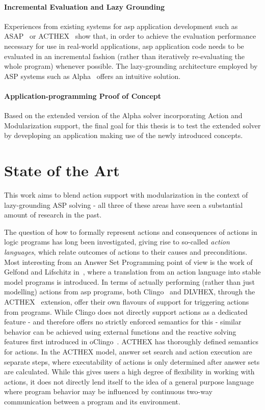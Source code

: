 \paragraph{Incremental Evaluation and Lazy Grounding} Experiences from existing systems for \gls{asp} application development such as ASAP~\cite{aspetris} or ACTHEX~\cite{acthex} show that, in order to achieve the evaluation performance necessary for use in real-world applications, \gls{asp} application code needs to be evaluated in an incremental fashion (rather than iteratively re-evaluating the whole program) whenever possible. The lazy-grounding architecture employed by ASP systems such as Alpha~\cite{alpha} offers an intuitive solution.

\paragraph{Application-programming Proof of Concept} Based on the extended version of the Alpha solver incorporating Action and Modularization support, the final goal for this thesis is to test the extended solver by deveploping an application making use of the newly introduced concepts.

\section{State of the Art}
\label{sec:state-of-the-art}
This work aims to blend action support with modularization in the context of lazy-grounding ASP solving - all three of these areas have seen a substantial amount of research in the past.

The question of how to formally represent actions and consequences of actions in logic programs has long been investigated, giving rise to so-called \emph{action languages}, which relate outcomes of actions to their causes and preconditions. Most interesting from an Answer Set Programming  point of view is the work of Gelfond and Lifschitz in~\cite{action-and-change}, where a translation from an action language into stable model programs is introduced. In terms of actually performing (rather than just modelling) actions from \gls{asp} programs, both Clingo~\cite{clingo4} and DLVHEX, through the ACTHEX~\cite{acthex} extension, offer their own flavours of support for triggering actions from programs. While Clingo does not directly support actions as a dedicated feature - and therefore offers no strictly enforced semantics for this - similar behavior can be achieved using external functions and the reactive solving features first introduced in oClingo~\cite{oclingo}. ACTHEX has thoroughly defined semantics for actions. In the ACTHEX model, answer set search and action execution are separate steps, where executability of actions is only determined after answer sets are calculated. While this gives users a high degree of flexibility in working with actions, it does not directly lend itself to the idea of a general purpose language where program behavior may be influenced by continuous two-way communication between a program and its environment.

